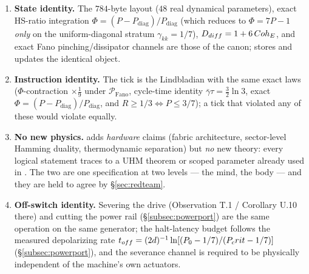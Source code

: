\begin{enumerate}[leftmargin=1.6em,itemsep=1pt]
  \item \textbf{State identity.} The $784$-byte \DM{} layout ($48$ real
        dynamical parameters), exact HS-ratio integration
        $\Phi=(P-P_{\mathrm{diag}})/P_{\mathrm{diag}}$ (which reduces to
        $\Phi=7P-1$ \emph{only} on the uniform-diagonal stratum
        $\gamma_{kk}=1/7$), $D_{diff}=1+6\,Coh_E$, and exact Fano
        pinching/dissipator channels are those of the \SYNARC{} canon; \TALOS{}
        stores and updates the identical object.
  \item \textbf{Instruction identity.} The tick is the \SYNARC{} Lindbladian
        with the same exact laws ($\Phi$-contraction $\times\tfrac19$ under
        $\mathcal{P}_{\mathrm{Fano}}$, cycle-time identity
        $\bar\gamma\tau=\tfrac32\ln3$, exact
        $\Phi=(P-P_{\mathrm{diag}})/P_{\mathrm{diag}}$, and
        $R\ge 1/3\Leftrightarrow P\le 3/7$); a \TALOS{} tick that violated any
        of these would violate \SYNARC{} equally.
  \item \textbf{No new physics.} \TALOS{} adds \emph{hardware} claims (fabric
        architecture, sector-level Hamming duality, thermodynamic separation)
        but \emph{no} new theory: every logical statement traces to a UHM
        theorem or scoped parameter already used in \SYNARC{}. The two are one
        specification at two levels --- \SYNARC{} the mind, \TALOS{} the body
        --- and they are held to agree by \S\ref{sec:redteam}.
  \item \textbf{Off-switch identity.} Severing the \SYNARC{} drive
        (Observation T.1 / Corollary U.10 there) and cutting the \TALOS{}
        power rail (\S\ref{subsec:powerport}) are the same operation on the
        same generator; the halt-latency budget follows the measured
        depolarizing rate $t_{off}=(2d)^{-1}\ln[(P_0-1/7)/(P_crit-1/7)]$
        (\S\ref{subsec:powerport}), and the severance channel is required to be
        physically independent of the machine's own actuators.
\end{enumerate}
